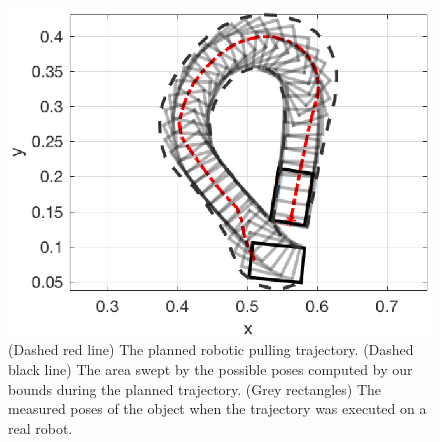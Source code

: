 \documentclass[conference]{IEEEtran}
\begin{document}




\begin{figure}
\begin{center}
  \includegraphics[width=\columnwidth]{fig/trajectory_2.eps}
\end{center}
\caption{(Dashed red line) The planned robotic pulling
  trajectory. (Dashed black line) The area swept by the possible poses
  computed by our bounds during the planned trajectory. (Grey
  rectangles) The measured poses of the object when the trajectory was
  executed on a real robot.}
\label{fig:trajectory}
\end{figure}
\end{document}
